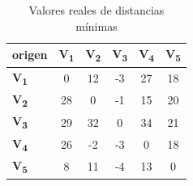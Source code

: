 \documentclass[../tp2_grupo404.tex]{subfiles}
\begin{document}
\begin{table}[H]
    \centering
    \begin{tabular}{@{}lccccc@{}}
    \toprule
    \textbf{origen} & \textbf{V\textsubscript{1}} & \textbf{V\textsubscript{2}} & \textbf{V\textsubscript{3}} & \textbf{V\textsubscript{4}} & \textbf{V\textsubscript{5}} \\ \midrule
    \textbf{V\textsubscript{1}}  &  0  & 12  & -3  & 27  & 18  \\
    \textbf{V\textsubscript{2}}  & 28  &  0  & -1  & 15  & 20  \\
    \textbf{V\textsubscript{3}}  & 29  & 32  &  0  & 34  & 21  \\
    \textbf{V\textsubscript{4}}  & 26  & -2  & -3  &  0  & 18  \\
    \textbf{V\textsubscript{5}}  &  8  & 11  & -4  & 13  &  0  \\ \bottomrule
    \end{tabular}
    \caption{Valores reales de distancias mínimas}
    \label{tab:AjusteJohnson_valores}
\end{table}
    
\end{document}
